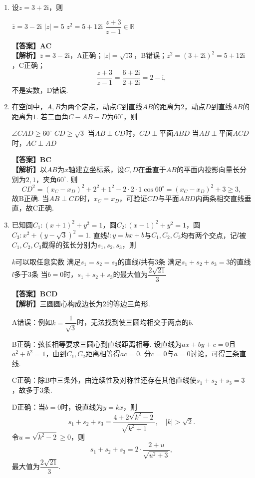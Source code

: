 \documentclass[12pt,a4paper]{article}
\begin{document}
	\begin{enumerate}[leftmargin=*,label=\arabic*.,resume,itemsep=0.8ex]
		
		\item 设$z=3+2\mathrm{i}$，则
		\begin{choicesTwo}
			\choice $\overline{z}=3-2\mathrm{i}$
			\choice $|z|=5$
			\choice $z^2=5+12\mathrm{i}$
			\choice $\dfrac{z+3}{z-1}\in\mathbb{R}$
		\end{choicesTwo}
		\textbf{【答案】AC}\\
		\textbf{【解析】}$\overline z=3-2\mathrm i$，A正确；$|z|=\sqrt{13}$，B错误；$z^2=(3+2\mathrm i)^2=5+12\mathrm i$，C正确；
		\[
		\frac{z+3}{z-1}=\frac{6+2\mathrm i}{2+2\mathrm i}=2-\mathrm i,
		\]
		不是实数，D错误.
		
		\item 在空间中，$A,B$为两个定点，动点$C$到直线$AB$的距离为$2$，动点$D$到直线$AB$的距离为$1$. 若二面角$C-AB-D$为$60^\circ$，则
		\begin{choicesOne}
			\choice $\angle CAD\ge60^\circ$
			\choice $CD\ge\sqrt3$
			\choice 当$AB\perp CD$时，$CD\perp$平面$ABD$
			\choice 当$AB\perp$平面$ACD$时，$AC\perp AD$
		\end{choicesOne}
		\textbf{【答案】BC}\\
		\textbf{【解析】}以$AB$为$x$轴建立坐标系，设$C,D$在垂直于$AB$的平面内投影向量长分别为$2,1$，夹角$60^\circ$. 则
		\[
		CD^2=(x_C-x_D)^2+2^2+1^2-2\cdot2\cdot1\cos60^\circ
		=(x_C-x_D)^2+3\ge3,
		\]
		故B正确. 当$AB\perp CD$时，$x_C=x_D$，可验证$CD$与平面$ABD$内两条相交直线垂直，故C正确.
		
		\item 已知圆$C_1:(x+1)^2+y^2=1$，圆$C_2:(x-1)^2+y^2=1$，圆$C_3:x^2+(y-\sqrt3)^2=1$. 直线$l:y=kx+b$与$C_1,C_2,C_3$均有两个交点，记$l$被$C_1,C_2,C_3$截得的弦长分别为$s_1,s_2,s_3$，则
		\begin{choicesOne}
			\choice $k$可以取任意实数
			\choice 满足$s_1=s_2=s_3$的直线$l$共有$3$条
			\choice 满足$s_1+s_2+s_3=3$的直线$l$多于$3$条
			\choice 当$b=0$时，$s_1+s_2+s_3$的最大值为$\dfrac{2\sqrt{21}}{3}$
		\end{choicesOne}
		\textbf{【答案】BCD}\\
		\textbf{【解析】}三圆圆心构成边长为$2$的等边三角形.
		
		A错误：例如$k=\dfrac1{\sqrt3}$时，无法找到使三圆均相交于两点的$b$.
		
		B正确：弦长相等要求三圆心到直线距离相等. 设直线为$ax+by+c=0$且$a^2+b^2=1$，由到$C_1,C_2$距离相等得$ac=0$. 分$c=0$与$a=0$讨论，可得三条直线.
		
		C正确：除B中三条外，由连续性及对称性还存在其他直线使$s_1+s_2+s_3=3$，故多于$3$条.
		
		D正确：当$b=0$时，设直线为$y=kx$，则
		\[
		s_1+s_2+s_3=\frac{4+2\sqrt{k^2-2}}{\sqrt{k^2+1}},\quad |k|>\sqrt2.
		\]
		令$u=\sqrt{k^2-2}\ge0$，则
		\[
		s_1+s_2+s_3=2\cdot\frac{2+u}{\sqrt{u^2+3}},
		\]
		最大值为$\dfrac{2\sqrt{21}}3$.
		
	\end{enumerate}
	
\end{document}
